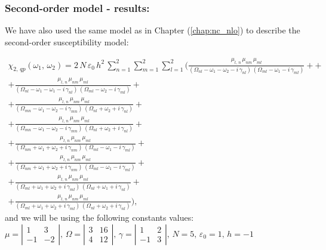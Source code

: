 \documentclass[12pt,twoside,a4paper]{article}
\numberwithin{equation}{subsection}
\numberwithin{figure}{subsection}
\begin{document}
\subsubsection*{Second-order model - results:}

We have also used the same model as in Chapter (\ref{chap:nc_nlo}) to describe the second-order susceptibility model:

\begin{multline} \label{eq:hht_qp2}
  \chi_{2, \,qp}({\omega_{1}}, \,{\omega_{2}}) 
  = 2\, N\,\varepsilon_{0}\,h^{2}\,\sum_{n=1}^{2}\sum_{m=1}^{2}\sum_{l=1}^{2}
  (      \frac {{\mu_{l,\,n}}\,{\mu_{nm}}\,{\mu_{ml}}}
      {({\Omega_{nl}} - \omega_1 - \omega_2 - i\,{\gamma_{nl}})\,({\Omega_{ml}} - \omega_1 - i\,{\gamma_{ml}})} +
  + \\ + \frac   {{\mu_{l, \,n}}\,{\mu_{nm}}\,{\mu_{ml}}}
      {({\Omega_{nl}} - \omega_1 - \omega_1 - i\,{\gamma_{nl}})\,({\Omega_{ml}} - \omega_2 - i\,{\gamma_{ml}})}
  + \\ + \frac   {{\mu_{l, \,n}}\,{\mu_{nm}}\,{\mu_{ml}}}
      {({\Omega_{mn}} - \omega_1 - \omega_2 - i\,{\gamma_{mn}})\,({\Omega_{nl}} + \omega_2 + i\,{\gamma_{nl}})}
  + \\ + \frac{{\mu_{l, \,n }}\,{\mu_{nm}}\,{\mu_{ml}}} 
      {({\Omega_{mn}} - \omega_1 - \omega_2 - i\,{\gamma_{mn}})\,({\Omega_{nl}} + \omega_2 + i\,{\gamma_{nl}})} 
  + \\ + \frac   {{\mu_{l, \,n}}\,{\mu_{nm}}\,{\mu_{ml}}}
      {({\Omega_{nm}} + \omega_1 + \omega_2 + i\,{\gamma_{nm}})\,({\Omega_{ml}} - \omega_1 - i\,{\gamma_{ml}})}
  + \\ + \frac {{\mu_{l, \,n}}\,{\mu_{ nm}}\,{\mu_{ml}}}
      {({\Omega_{nm}} + \omega_1 + \omega_2 + i\,{\gamma_{nm}})\,({\Omega_{ml}} - \omega_1 - i\,{\gamma_{ml}})} 
  + \\ + \frac {{\mu_{l, \,n}}\,{\mu_{nm}}\,{\mu_{ml}}}
      {({\Omega_{ml}} + \omega_1 + \omega_2 + i\,{\gamma_{ml}})\,({\Omega_{nl}} + \omega_1 + i\,{\gamma_{nl}})}
  + \\ + \frac {{\mu_{l, \,n}}\,{\mu_{nm}}\,{\mu_{ml}}}
      {({\Omega_{ml}} + \omega_1 + \omega_2 + i\,{\gamma_{ml}})\,({\Omega_{nl}} + \omega_2 + i\,{\gamma_{nl}})}
  ) ,
\end{multline}
and we will be using the following constants values: \\
$\mu = \left| \begin{array}{cc} 
    1 & 3 \\ -1 & -2 
  \end{array} \right|,\, 
  \Omega = \left| \begin{array}{cc} 
    3 & 16 \\ 4 & 12 
  \end{array} \right|,\,
  \gamma = \left| \begin{array}{cc} 
  1 & 2 \\ -1 & 3
  \end{array} \right|,\, N=5,\, {\varepsilon_{0}}=1,\,h= - 1$
\end{document}
